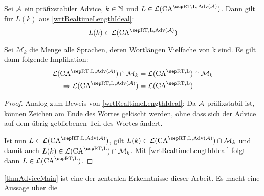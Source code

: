 \begin{lemma}
    \label{wrtRealtimeLengthIdealAdvice}
    
    Sei $\mathcal{A}$ ein präfixstabiler Advice, $k \in \mathbb{N}$ und $L \in \CAL{\CART, \CALeft, \orakel({\advA})}$.
    Dann gilt für $L(k)$ aus \cref{wrtRealtimeLengthIdeal}:
    \[
        L(k) \in \CAL{\CART, \CALeft, \orakel({\advA})}
    \]
    
    Sei $\mathcal{M}_k$ die Menge alle Sprachen, deren Wortlängen Vielfache von k sind.
    Es gilt dann folgende Implikation:
    \begin{align*}
        \CAL{\CART, \CALeft, \orakel({\advA})} \cap \mathcal{M}_k  & = \CAL{\CART, \CALeft} \cap \mathcal{M}_k \\
        \Rightarrow
        \CAL{\CART, \CALeft, \orakel({\advA})} & = \CAL{\CART, \CALeft}
    \end{align*}
\end{lemma}
\begin{proof}
    Analog zum Beweis von \cref{wrtRealtimeLengthIdeal}:
    Da $\mathcal{A}$ präfixstabil ist, können Zeichen am Ende des Wortes gelöscht werden, ohne dass sich
    der Advice auf dem übrig gebliebenen Teil des Wortes ändert.
    
    Ist nun $L \in \CAL{\CART, \CALeft, \orakel({\advA})}$,
    gilt $L(k) \in \CAL{\CART, \CALeft, \orakel({\advA})} \cap \mathcal{M}_k$
    und damit auch
    $L(k) \in \CAL{\CART, \CALeft} \cap \mathcal{M}_k$.
    Mit \cref{wrtRealtimeLengthIdeal} folgt dann $L \in \CAL{\CART, \CALeft}$.
\end{proof}

\cref{thmAdviceMain} ist eine der zentralen Erkenntnisse dieser Arbeit.
Es macht eine Aussage über die 

